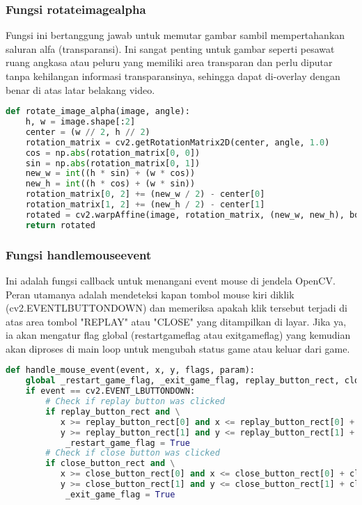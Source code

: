 \documentclass[11pt,a4paper]{article}
\begin{document}
\subsubsection{Fungsi rotate\textunderscore image\textunderscore alpha}
Fungsi ini bertanggung jawab untuk memutar gambar sambil mempertahankan saluran alfa (transparansi). Ini sangat penting untuk gambar seperti pesawat ruang angkasa atau peluru yang memiliki area transparan dan perlu diputar tanpa kehilangan informasi transparansinya, sehingga dapat di-overlay dengan benar di atas latar belakang video.
\begin{lstlisting}[language=Python, caption=rotate\textunderscore image\textunderscore alpha]
def rotate_image_alpha(image, angle):
    h, w = image.shape[:2]
    center = (w // 2, h // 2)
    rotation_matrix = cv2.getRotationMatrix2D(center, angle, 1.0)
    cos = np.abs(rotation_matrix[0, 0])
    sin = np.abs(rotation_matrix[0, 1])
    new_w = int((h * sin) + (w * cos))
    new_h = int((h * cos) + (w * sin))
    rotation_matrix[0, 2] += (new_w / 2) - center[0]
    rotation_matrix[1, 2] += (new_h / 2) - center[1]
    rotated = cv2.warpAffine(image, rotation_matrix, (new_w, new_h), borderMode=cv2.BORDER_CONSTANT, borderValue=(0, 0, 0, 0))
    return rotated
\end{lstlisting}

\subsubsection{Fungsi handle\textunderscore mouse\textunderscore event}
Ini adalah fungsi callback untuk menangani event mouse di jendela OpenCV. Peran utamanya adalah mendeteksi kapan tombol mouse kiri diklik (cv2.EVENT\textunderscore\textunderscore LBUTTONDOWN) dan memeriksa apakah klik tersebut terjadi di atas area tombol "REPLAY" atau "CLOSE" yang ditampilkan di layar. Jika ya, ia akan mengatur flag global (\textunderscore restart\textunderscore game\textunderscore flag atau \textunderscore exit\textunderscore game\textunderscore flag) yang kemudian akan diproses di main loop untuk mengubah status game atau keluar dari game.
\begin{lstlisting}[language=Python, caption=handle\textunderscore mouse\textunderscore event]
def handle_mouse_event(event, x, y, flags, param):
    global _restart_game_flag, _exit_game_flag, replay_button_rect, close_button_rect
    if event == cv2.EVENT_LBUTTONDOWN:
        # Check if replay button was clicked
        if replay_button_rect and \
           x >= replay_button_rect[0] and x <= replay_button_rect[0] + replay_button_rect[2] and \
           y >= replay_button_rect[1] and y <= replay_button_rect[1] + replay_button_rect[3]:
            _restart_game_flag = True
        # Check if close button was clicked
        if close_button_rect and \
           x >= close_button_rect[0] and x <= close_button_rect[0] + close_button_rect[2] and \
           y >= close_button_rect[1] and y <= close_button_rect[1] + close_button_rect[3]:
            _exit_game_flag = True
\end{lstlisting}
\end{document}
